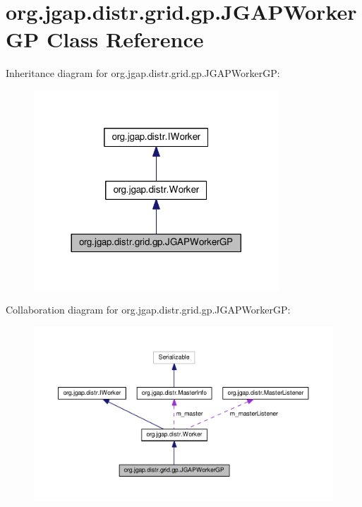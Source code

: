\hypertarget{classorg_1_1jgap_1_1distr_1_1grid_1_1gp_1_1_j_g_a_p_worker_g_p}{\section{org.\-jgap.\-distr.\-grid.\-gp.\-J\-G\-A\-P\-Worker\-G\-P Class Reference}
\label{classorg_1_1jgap_1_1distr_1_1grid_1_1gp_1_1_j_g_a_p_worker_g_p}
}


Inheritance diagram for org.\-jgap.\-distr.\-grid.\-gp.\-J\-G\-A\-P\-Worker\-G\-P\-:
\nopagebreak
\begin{figure}[H]
\begin{center}
\leavevmode
\includegraphics[width=260pt]{classorg_1_1jgap_1_1distr_1_1grid_1_1gp_1_1_j_g_a_p_worker_g_p__inherit__graph}
\end{center}
\end{figure}


Collaboration diagram for org.\-jgap.\-distr.\-grid.\-gp.\-J\-G\-A\-P\-Worker\-G\-P\-:
\nopagebreak
\begin{figure}[H]
\begin{center}
\leavevmode
\includegraphics[width=350pt]{classorg_1_1jgap_1_1distr_1_1grid_1_1gp_1_1_j_g_a_p_worker_g_p__coll__graph}
\end{center}
\end{figure}
